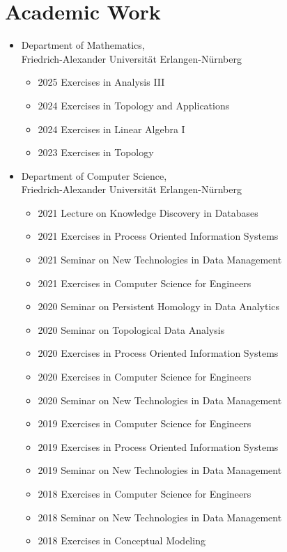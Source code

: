 \documentclass[a4paper, 11pt]{article}
\newcommand{\years}[1]{\marginnote{\scriptsize #1}}
\begin{document}
\newpage
\section*{Academic Work}
\years{Teaching}
\vspace{-2pt}
\begin{itemize}[noitemsep, leftmargin=*]
	\item Department of Mathematics, \\
	      Friedrich-Alexander Universität Erlangen-Nürnberg
	      \begin{itemize}
	      	\item 2025 Exercises in Analysis III
	      	\item 2024 Exercises in Topology and Applications
	      	\item 2024 Exercises in Linear Algebra I
	      	\item 2023 Exercises in Topology
	      \end{itemize}
	\item Department of Computer Science, \\
	      Friedrich-Alexander Universität Erlangen-Nürnberg
	      \begin{itemize}
	      	\item 2021 Lecture on Knowledge Discovery in Databases
	      	\item 2021 Exercises in Process Oriented Information Systems
	      	\item 2021 Seminar on New Technologies in Data Management
	      	\item 2021 Exercises in Computer Science for Engineers
	      	\item 2020 Seminar on Persistent Homology in Data Analytics
	      	\item 2020 Seminar on Topological Data Analysis
	      	\item 2020 Exercises in Process Oriented Information Systems
	      	\item 2020 Exercises in Computer Science for Engineers
	      	\item 2020 Seminar on New Technologies in Data Management
	      	\item 2019 Exercises in Computer Science for Engineers
	      	\item 2019 Exercises in Process Oriented Information Systems
	      	\item 2019 Seminar on New Technologies in Data Management
	      	\item 2018 Exercises in Computer Science for Engineers
	      	\item 2018 Seminar on New Technologies in Data Management
	      	\item 2018 Exercises in Conceptual Modeling
	      \end{itemize}
\end{itemize}
\vspace{10pt}
\end{document}
